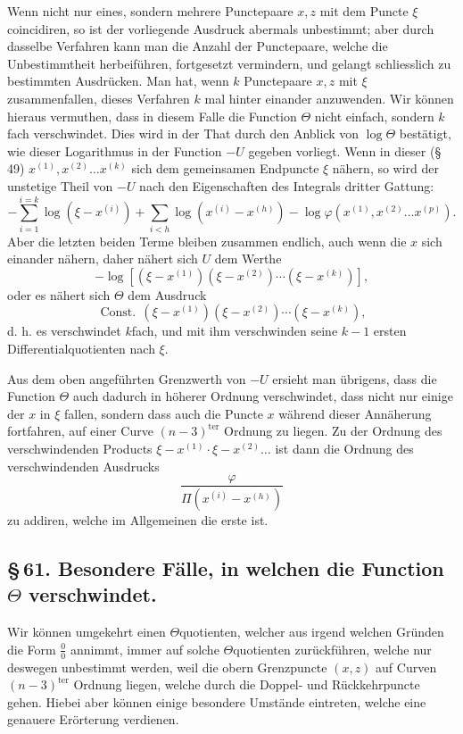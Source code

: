\documentclass[10pt]{article}
\begin{document}
Wenn nicht nur eines, sondern mehrere Punctepaare \(x,z\) mit dem Puncte \(\xi\) coincidiren, so ist der vorliegende Ausdruck abermals unbestimmt; aber durch dasselbe Verfahren kann man die Anzahl der Punctepaare, welche die Unbestimmtheit herbeiführen, fortgesetzt vermindern, und gelangt schliesslich zu bestimmten Ausdrücken. Man hat, wenn \(k\) Punctepaare \(x,z\) mit \(\xi\) zusammenfallen, dieses Verfahren \(k\) mal hinter einander anzuwenden. Wir können hieraus vermuthen, dass in diesem Falle die Function \(\Theta\) nicht einfach, sondern \(k\)fach verschwindet. Dies wird in der That durch den Anblick von \(\log\Theta\) bestätigt, wie dieser Logarithmus in der Function \(-U\) gegeben vorliegt. Wenn in dieser (\S\,49) \(x^{(1)},x^{(2)}\ldots x^{(k)}\) sich dem gemeinsamen Endpuncte \(\xi\) nähern, so wird der unstetige Theil von \(-U\) nach den Eigenschaften des Integrals dritter Gattung:
\[
-\sum_{i=1}^{i=k}\log(\xi-x^{(i)})+
\sum_{i<h}\log(x^{(i)}-x^{(h)})-
\log\varphi(x^{(1)},x^{(2)}\ldots x^{(p)}).
\]
Aber die letzten beiden Terme bleiben zusammen endlich, auch wenn die \(x\) sich einander nähern, daher nähert sich \(U\) dem Werthe
\[
-\log\left[(\xi-x^{(1)})(\xi-x^{(2)})\cdots(\xi-x^{(k)})\right],
\]
oder es nähert sich \(\Theta\) dem Ausdruck
\[
\operatorname{Const.}\,(\xi-x^{(1)})(\xi-x^{(2)})\cdots(\xi-x^{(k)}),
\]
d. h. es verschwindet \(k\)fach, und mit ihm verschwinden seine \(k-1\) ersten Differentialquotienten nach \(\xi\).

Aus dem oben angeführten Grenzwerth von \(-U\) ersieht man übrigens, dass die Function \(\Theta\) auch dadurch in höherer Ordnung verschwindet, dass nicht nur einige der \(x\) in \(\xi\) fallen, sondern dass auch die Puncte \(x\) während dieser Annäherung fortfahren, auf einer Curve \((n-3)^{\mathrm{ter}}\) Ordnung zu liegen. Zu der Ordnung des verschwindenden Products \(\xi-x^{(1)}\cdot\xi-x^{(2)}\ldots\) ist dann die Ordnung des verschwindenden Ausdrucks
\[
\frac{\varphi}{\Pi(x^{(i)}-x^{(h)})}
\]
zu addiren, welche im Allgemeinen die erste ist.

\subsection*{\S\,61. Besondere Fälle, in welchen die Function \(\Theta\) verschwindet.}

Wir können umgekehrt einen \(\Theta\)quotienten, welcher aus irgend welchen Gründen die Form \(\frac{0}{0}\) annimmt, immer auf solche \(\Theta\)quotienten zurückführen, welche nur deswegen unbestimmt werden, weil die obern Grenzpuncte \((x,z)\) auf Curven \((n-3)^{\mathrm{ter}}\) Ordnung liegen, welche durch die Doppel- und Rückkehrpuncte gehen. Hiebei aber können einige besondere Umstände eintreten, welche eine genauere Erörterung verdienen.
\end{document}
